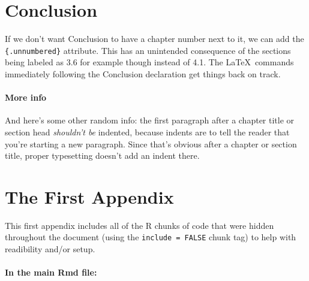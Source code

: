 \documentclass[12pt,twoside]{amherstthesis}
\begin{document}
  \chapter*{Conclusion}\label{conclusion}
  
  \setcounter{chapter}{4} \setcounter{section}{0}
  
  If we don't want Conclusion to have a chapter number next to it, we can
  add the \texttt{\{.unnumbered\}} attribute. This has an unintended
  consequence of the sections being labeled as 3.6 for example though
  instead of 4.1. The \LaTeX~commands immediately following the Conclusion
  declaration get things back on track.
  
  \subsubsection{More info}\label{more-info}
  
  And here's some other random info: the first paragraph after a chapter
  title or section head \emph{shouldn't be} indented, because indents are
  to tell the reader that you're starting a new paragraph. Since that's
  obvious after a chapter or section title, proper typesetting doesn't add
  an indent there.
  
  \appendix
  
  \singlespacing
  
  \chapter{The First Appendix}\label{the-first-appendix}
  
  This first appendix includes all of the R chunks of code that were
  hidden throughout the document (using the \texttt{include\ =\ FALSE}
  chunk tag) to help with readibility and/or setup.
  
  \subsubsection{In the main Rmd file:}\label{in-the-main-rmd-file}
  
  \begin{Shaded}
  \begin{Highlighting}[]
  \NormalTok{(}\OperatorTok{!}
    \NormalTok{(}\NormalTok{, } \NormalTok{)}
  \NormalTok{(}\OperatorTok{!}
  \OperatorTok{::}\NormalTok{(}\NormalTok{)}
  \NormalTok{\}}
  \end{Highlighting}
  \end{Shaded}
  
\end{document}
